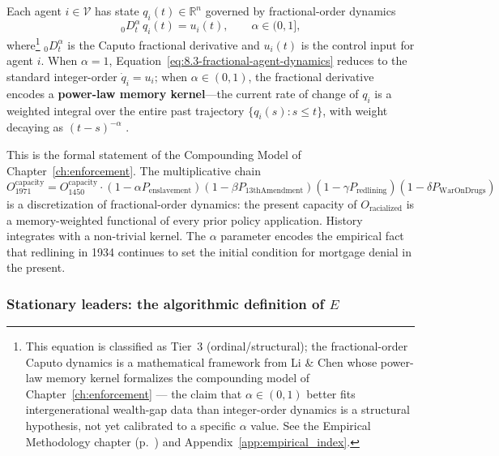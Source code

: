 Each agent $i \in \mathcal{V}$ has state $q_i(t) \in \mathbb{R}^n$ governed by fractional-order dynamics
\begin{equation}
{}_{\,0}D_t^{\alpha}\, q_i(t) = u_i(t), \qquad \alpha \in (0,1], \label{eq:8.3-fractional-agent-dynamics}
\end{equation}
where\footnote{This equation is classified as Tier~3 (ordinal/structural); the fractional-order Caputo dynamics is a mathematical framework from Li \& Chen \cite{li_mittag_leffler} whose power-law memory kernel formalizes the compounding model of Chapter~\ref{ch:enforcement} --- the claim that $\alpha \in (0,1)$ better fits intergenerational wealth-gap data than integer-order dynamics is a structural hypothesis, not yet calibrated to a specific $\alpha$ value. See the Empirical Methodology chapter (p.~\pageref{ch:empirical_methodology}) and Appendix~\ref{app:empirical_index}.} ${}_{0}D_t^{\alpha}$ is the Caputo fractional derivative and $u_i(t)$ is the control input for agent $i$. When $\alpha = 1$, Equation~\ref{eq:8.3-fractional-agent-dynamics} reduces to the standard integer-order $\dot{q}_i = u_i$; when $\alpha \in (0,1)$, the fractional derivative encodes a \textbf{power-law memory kernel}---the current rate of change of $q_i$ is a weighted integral over the entire past trajectory $\{q_i(s) : s \leq t\}$, with weight decaying as $(t-s)^{-\alpha}$ \cite{li_mittag_leffler}.

This is the formal statement of the Compounding Model of Chapter~\ref{ch:enforcement}. The multiplicative chain
\begin{equation}\label{eq:8.4-compounding-chain-formal}
O_{1971}^{\text{capacity}} = O_{1450}^{\text{capacity}} \cdot (1-\alpha P_{\text{enslavement}})(1-\beta P_{\text{13thAmendment}})(1-\gamma P_{\text{redlining}})(1-\delta P_{\text{WarOnDrugs}})
\end{equation}
is a discretization of fractional-order dynamics: the present capacity of $O_{\text{racialized}}$ is a memory-weighted functional of every prior policy application. History integrates with a non-trivial kernel. The $\alpha$ parameter encodes the empirical fact that redlining in 1934 continues to set the initial condition for mortgage denial in the present.

\subsubsection*{Stationary leaders: the algorithmic definition of \texorpdfstring{$E$}{E}}

